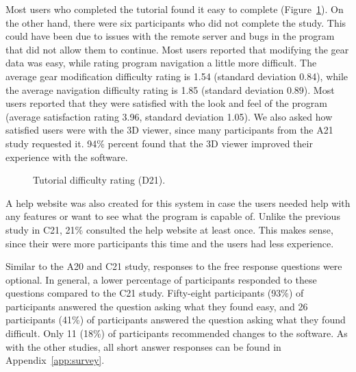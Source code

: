 \begin{doublespace}
Most users who completed the tutorial found it easy to complete (Figure~\ref{fig:difficulty2}). On the other hand, there were six participants who did not complete the study. This could have been due to issues with the remote server and bugs in the program that did not allow them to continue. Most users reported that modifying the gear data was easy, while rating program navigation a little more difficult. The average gear modification difficulty rating is 1.54 (standard deviation 0.84), while the average navigation difficulty rating is 1.85 (standard deviation 0.89). Most users reported that they were satisfied with the look and feel of the program (average satisfaction rating 3.96, standard deviation 1.05). We also asked how satisfied users were with the 3D viewer, since many participants from the A21 study requested it. 94\% percent found that the 3D viewer improved their experience with the software.

\begin{figure}[htbp]
    \centering
    \caption{Tutorial difficulty rating (D21).}
    \label{fig:difficulty2}
\end{figure}

A help website was also created for this system in case the users needed help with any features or want to see what the program is capable of. Unlike the previous study in C21, 21\% consulted the help website at least once. This makes sense, since their were more participants this time and the users had less experience.

Similar to the A20 and C21 study, responses to the free response questions were optional. In general, a lower percentage of participants responded to these questions compared to the C21 study. Fifty-eight participants (93\%) of participants answered the question asking what they found easy, and 26 participants (41\%) of participants answered the question asking what they found difficult. Only 11 (18\%) of participants recommended changes to the software. As with the other studies, all short answer responses can be found in Appendix~\ref{app:survey}.


\end{doublespace}
